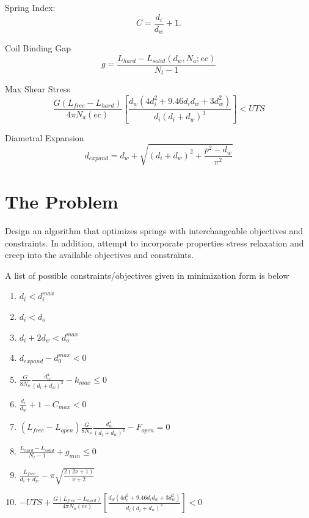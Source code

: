 \documentclass[10pt]{article}
\begin{document}
				 Spring Index:\begin{equation}C = \frac{d_{i}}{d_{w}} + 1.\end{equation}
				
				Coil Binding Gap\begin{equation} g = \frac{L_{hard} - L_{solid}(d_{w},N_{a}; ec)}{N_{t} - 1}\end{equation}
		
				 Max Shear Stress\begin{equation} \frac{G(L_{free} - L_{hard})}{4 \pi N_{a} (ec)} \left[\frac{d_{w} (4d_{i}^{2} + 9.46d_{i} 
d_{w} + 3 d_{w}^{2})}{d_{i}(d_{i}+d_{w})^{3}}\right]< UTS\end{equation}
		
				Diametral Expansion\begin{equation} d_{expand} = d_{w} + \sqrt{(d_{i} + d_{w})^{2} + \frac{p^{2} - d_{w}}{\pi^{2}}}
			\end{equation}
			
\section{The Problem} 

Design an algorithm that optimizes springs with interchangeable objectives and constraints. In addition, attempt to incorporate properties stress relaxation and creep into the available objectives and constraints. 

A list of possible constraints/objectives given in minimization form is below

\begin{enumerate}
\item $d_{i} < d_{i}^{max}$
\item $d_{i} < d_{o}$
\item $d_{i} + 2d_{w} < d_{o}^{max}$
\item$d_{expand} - d_{0}^{max} < 0 $
\item$ \frac{G}{8N_{a}}\frac{d_{w}^{4}}{(d_{i} + d_{w})^{3}} - k_{max} \le 0 $
\item $\frac{d_{i}}{d_{w}} + 1 - C_{max}< 0$
\item $(L_{free} - L_{open})\frac{G}{8N_{a}}\frac{d_{w}^{4}}{(d_{i} + d_{w})^{3}} - F_{open} = 0 $
\item $\frac{L_{hard} - L_{solid}}{N_{t} - 1} + g_{min} \le  0$
\item$\frac{L_{free}}{d_{i} + d_{w}} - \pi \sqrt{\frac{2(2 \nu + 1)}{\nu + 2}}$
\item$-UTS + \frac{G(L_{free} - L_{hard})}{4 \pi N_{a} (ec)} \left[\frac{d_{w} (4d_{i}^{2} + 9.46d_{i} 
d_{w} + 3 d_{w}^{2})}{d_{i}(d_{i}+d_{w})^{3}}\right] < 0$
\end{enumerate}	
\end{document}
